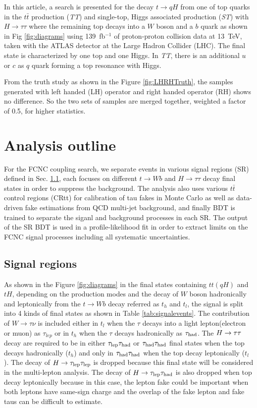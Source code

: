 In this article, a search is presented for the decay $t\to qH$ from one of top quarks in the $t\bar{t}$ production (\textit{TT}) and single-top, Higgs associated production (\textit{ST}) with $H\to\tau\tau$ where the remaining top decays into a $W$ boson and a $b$ quark as shown in Fig \ref{fig:diagrams} using 139~fb$^{-1}$ of proton-proton collision data at 13~TeV, taken with the ATLAS detector at the Large Hadron Collider (LHC). The final state is characterized by one top and one Higgs. In \textit{TT}, there is an additional $u$ or $c$ as $q$ quark forming a top resonance with Higgs.



From the truth study as shown in the Figure \ref{fig:LHRHTruth}, the samples generated with left handed (LH) operator and right handed operator (RH) shows no difference. So the two sets of samples are merged together, weighted a factor of 0.5, for higher statistics.



\section{Analysis outline}

For the FCNC coupling search, we separate events in various signal regions (SR) defined in Sec. \ref{sec:SRs}, each focuses on
different $t\to Wb$ and $H\to\tau\tau$ decay final states in order to suppress the background.
The analysis also uses various $t\bar{t}$ control regions (CRtt) for calibration of tau fakes in Monte Carlo as well as
data-driven fake estimations from QCD multi-jet background, and finally BDT is trained to separate the
siganl and background processes in each SR. The output of
the SR BDT is used in a profile-likelihood fit in order to extract limits on the FCNC signal processes including all systematic uncertainties.

\subsection{Signal regions}
\label{sec:SRs}
As shown in the Figure \ref{fig:diagrams} in the final states containing $tt(qH)$ and $tH$, depending on the production modes and
the decay of $W$ boson hadronically and leptonically from the $t\to Wb$ decay referred as $t_h$ and $t_l$,
the signal is split into 4 kinds of final states as shown in Table \ref{tab:signalevents}. The contribution of $W\rightarrow\tau\nu$ is included either in 
$t_l$ when the $\tau$ decays into a light lepton(electron or muon) as $\tau_{lep}$ or in $t_h$ when the $\tau$ decays hadronically as $\tau_\text{had}$. 
 The $H \rightarrow \tau\tau$ decay are required to be in either $\tau_\text{lep}{}\tau_\text{had}$ or $\tau_\text{had}{}\tau_\text{had}$ final states when the top decays hadronically ($t_h$) and only in $\tau_\text{had}{}\tau_\text{had}$ when the top decay leptonically ($t_l$). The decay of $H\to\tau_\text{lep}{}\tau_\text{lep}$ is dropped because this final state will be considered in the multi-lepton analysis. The decay of $H\to\tau_\text{lep}{}\tau_\text{had}$ is also dropped when top decay leptonically because in this case, the lepton fake could be important when both leptons have same-sign charge
and the overlap of the fake lepton and fake taus can be difficult to estimate.

